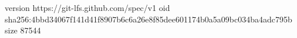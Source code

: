 version https://git-lfs.github.com/spec/v1
oid sha256:4bbd34067f141d41f8907b6c6a26e8f85dee601174b0a5a09bc034ba4adc795b
size 87544

